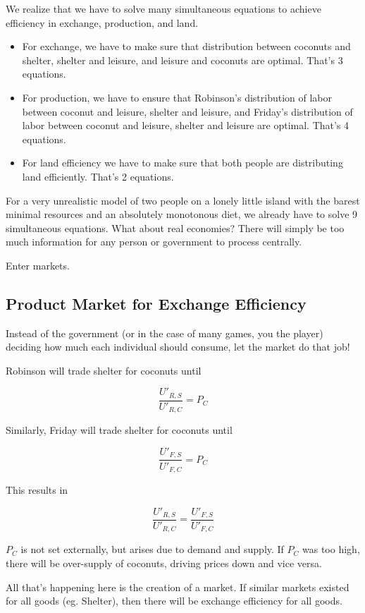 \documentclass[11pt]{scrartcl}
\begin{document}
We realize that we have to solve many simultaneous equations to achieve efficiency in exchange, production, and land. 

\begin{itemize}

\item For exchange, we have to make sure that distribution between coconuts and shelter, shelter and leisure, and leisure and coconuts are optimal. That's 3 equations.
\item For production, we have to ensure that Robinson's distribution of labor between coconut and leisure, shelter and leisure, and Friday's distribution of labor between coconut and leisure, shelter and leisure are optimal. That's 4 equations.
\item For land efficiency we have to make sure that both people are distributing land efficiently. That's 2 equations.
\end{itemize}

For a very unrealistic model of two people on a lonely little island with the barest minimal resources and an absolutely monotonous diet, we already have to solve 9 simultaneous equations. What about real economies? There will simply be too much information for any person or government to process centrally.

Enter markets.

\subsection{Product Market for Exchange Efficiency}

Instead of the government (or in the case of many games, you the player) deciding how much each individual should consume, let the market do that job!

Robinson will trade shelter for coconuts until

\[ \frac{U'_{R,S}}{U'_{R,C}} = P_C \]

Similarly, Friday will trade shelter for coconuts until

\[ \frac{U'_{F,S}}{U'_{F,C}} = P_C \]

This results in

\[ \frac{U'_{R,S}}{U'_{R,C}} = \frac{U'_{F,S}}{U'_{F,C}} \]

$P_C$ is not set externally, but arises due to demand and supply. If $P_C$ was too high, there will be over-supply of coconuts, driving prices down and vice versa. 

All that's happening here is the creation of a market. If similar markets existed for all goods (eg. Shelter), then there will be exchange efficiency for all goods.
\end{document}
